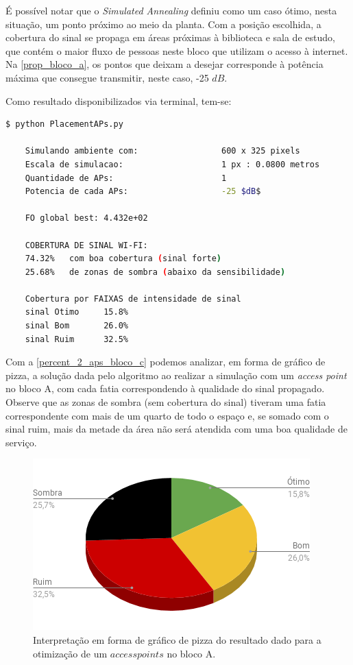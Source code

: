 \documentclass[
	12pt,				%
	twoside,			%
	a4paper,			%
	english,			%
	french,				%
	spanish,			%
	brazil				%
	]{abntex2}
\begin{document}
É possível notar que o \emph{Simulated Annealing} definiu como um caso
ótimo, nesta situação, um ponto próximo ao meio da planta. Com a posição
escolhida, a cobertura do sinal se propaga em áreas próximas à
biblioteca e sala de estudo, que contém o maior fluxo de pessoas neste
bloco que utilizam o acesso à internet. Na \autoref{prop_bloco_a}, os
pontos que deixam a desejar corresponde à potência máxima que consegue
transmitir, neste caso, -25 \(dB\).

Como resultado disponibilizados via terminal, tem-se:

\begin{lstlisting}[language=bash]
    $ python PlacementAPs.py 
    
    Simulando ambiente com:                 600 x 325 pixels
    Escala de simulacao:                    1 px : 0.0800 metros
    Quantidade de APs:                      1
    Potencia de cada APs:                   -25 $dB$
    
    FO global best: 4.432e+02
    
    COBERTURA DE SINAL WI-FI:
    74.32%   com boa cobertura (sinal forte)
    25.68%   de zonas de sombra (abaixo da sensibilidade)
    
    Cobertura por FAIXAS de intensidade de sinal
    sinal Otimo     15.8%
    sinal Bom       26.0%
    sinal Ruim      32.5%

\end{lstlisting}

Com a \autoref{percent_2_aps_bloco_c} podemos analizar, em forma de
gráfico de pizza, a solução dada pelo algoritmo ao realizar a simulação
com um \emph{access point} no bloco A, com cada fatia correspondendo à
qualidade do sinal propagado. Observe que as zonas de sombra (sem
cobertura do sinal) tiveram uma fatia correspondente com mais de um
quarto de todo o espaço e, se somado com o sinal ruim, mais da metade da
área não será atendida com uma boa qualidade de serviço.

\begin{figure}[ht]
    \caption{\label{percent_2_aps_bloco_c} Interpretação em forma de gráfico de pizza do resultado dado para a otimização
     de um $access points$ no bloco A.}
    \begin{center}
        \includegraphics[scale=0.7]{imagens/prop-bloco-percent-a-2.png}
    \end{center}
\end{figure}
\end{document}
